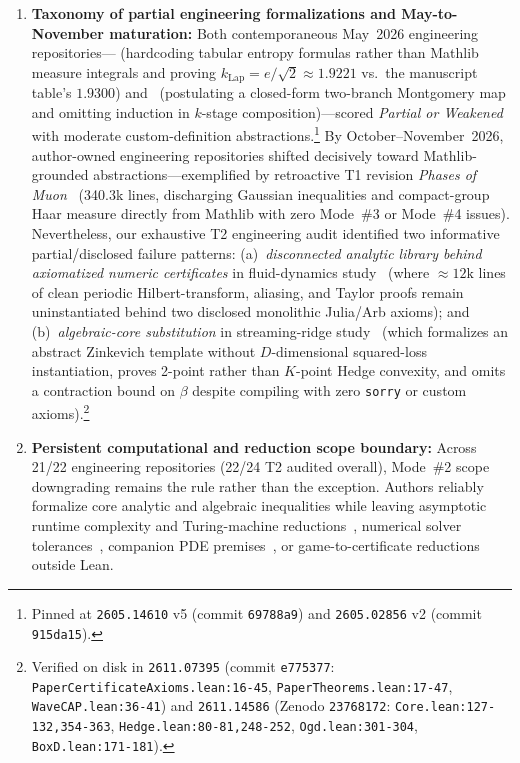 \documentclass[11pt,letterpaper]{article}
\begin{document}
\begin{enumerate}
  \item \textbf{Taxonomy of partial engineering formalizations and May-to-November maturation:} Both contemporaneous May~2026 engineering repositories---\cite{arxiv2605_14610} (hardcoding tabular entropy formulas rather than Mathlib measure integrals and proving $k_{\text{Lap}} = e/\sqrt{2} \approx 1.9221$ vs.\ the manuscript table's $1.9300$) and~\cite{arxiv2605_02856} (postulating a closed-form two-branch Montgomery map and omitting induction in $k$-stage composition)---scored \emph{Partial or Weakened} with moderate custom-definition abstractions.\footnote{Pinned at \texttt{2605.14610} v5 (commit \texttt{69788a9}) and \texttt{2605.02856} v2 (commit \texttt{915da15}).} By October--November~2026, author-owned engineering repositories shifted decisively toward Mathlib-grounded abstractions---exemplified by retroactive T1 revision \emph{Phases of Muon}~\cite{arxiv2605_09552} (340.3k lines, discharging Gaussian inequalities and compact-group Haar measure directly from Mathlib with zero Mode~\#3 or Mode~\#4 issues). Nevertheless, our exhaustive T2 engineering audit identified two informative partial/disclosed failure patterns: (a)~\emph{disconnected analytic library behind axiomatized numeric certificates} in fluid-dynamics study~\cite{arxiv2611_07395} (where $\approx 12\text{k}$ lines of clean periodic Hilbert-transform, aliasing, and Taylor proofs remain uninstantiated behind two disclosed monolithic Julia/Arb axioms); and (b)~\emph{algebraic-core substitution} in streaming-ridge study~\cite{arxiv2611_14586} (which formalizes an abstract Zinkevich template without $D$-dimensional squared-loss instantiation, proves 2-point rather than $K$-point Hedge convexity, and omits a contraction bound on $\beta$ despite compiling with zero \texttt{sorry} or custom axioms).\footnote{Verified on disk in \texttt{2611.07395} (commit \texttt{e775377}: \texttt{PaperCertificateAxioms.lean:16-45}, \texttt{PaperTheorems.lean:17-47}, \texttt{WaveCAP.lean:36-41}) and \texttt{2611.14586} (Zenodo \texttt{23768172}: \texttt{Core.lean:127-132,354-363}, \texttt{Hedge.lean:80-81,248-252}, \texttt{Ogd.lean:301-304}, \texttt{BoxD.lean:171-181}).}

  \item \textbf{Persistent computational and reduction scope boundary:} Across 21/22 engineering repositories (22/24 T2 audited overall), Mode~\#2 scope downgrading remains the rule rather than the exception. Authors reliably formalize core analytic and algebraic inequalities while leaving asymptotic runtime complexity and Turing-machine reductions~\cite{arxiv2611_14475,arxiv2611_05136,arxiv2611_12680}, numerical solver tolerances~\cite{arxiv2611_10902}, companion PDE premises~\cite{arxiv2611_12585}, or game-to-certificate reductions~\cite{arxiv2611_26140,arxiv2611_15128,arxiv2611_23762} outside Lean.


\end{enumerate}
\end{document}
